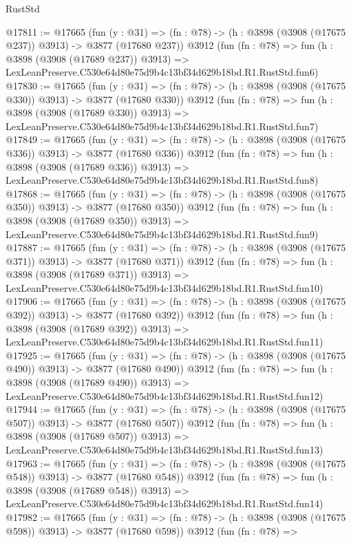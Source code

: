 \begin{lexlean}{RustStd}
\begin{coremodule}
@17811 := @17665
    (fun (y : @31) => (fn : @78) -> (h : @3898 (@3908 (@17675 @237)) @3913) -> @3877 (@17680 @237))
    @3912
    (fun (fn : @78) =>
    fun (h : @3898 (@3908 (@17689 @237)) @3913) =>
    LexLeanPreserve.C530e64d80e75d9b4c13bf34d629b18bd.R1.RustStd.fun6)
@17830 := @17665
    (fun (y : @31) => (fn : @78) -> (h : @3898 (@3908 (@17675 @330)) @3913) -> @3877 (@17680 @330))
    @3912
    (fun (fn : @78) =>
    fun (h : @3898 (@3908 (@17689 @330)) @3913) =>
    LexLeanPreserve.C530e64d80e75d9b4c13bf34d629b18bd.R1.RustStd.fun7)
@17849 := @17665
    (fun (y : @31) => (fn : @78) -> (h : @3898 (@3908 (@17675 @336)) @3913) -> @3877 (@17680 @336))
    @3912
    (fun (fn : @78) =>
    fun (h : @3898 (@3908 (@17689 @336)) @3913) =>
    LexLeanPreserve.C530e64d80e75d9b4c13bf34d629b18bd.R1.RustStd.fun8)
@17868 := @17665
    (fun (y : @31) => (fn : @78) -> (h : @3898 (@3908 (@17675 @350)) @3913) -> @3877 (@17680 @350))
    @3912
    (fun (fn : @78) =>
    fun (h : @3898 (@3908 (@17689 @350)) @3913) =>
    LexLeanPreserve.C530e64d80e75d9b4c13bf34d629b18bd.R1.RustStd.fun9)
@17887 := @17665
    (fun (y : @31) => (fn : @78) -> (h : @3898 (@3908 (@17675 @371)) @3913) -> @3877 (@17680 @371))
    @3912
    (fun (fn : @78) =>
    fun (h : @3898 (@3908 (@17689 @371)) @3913) =>
    LexLeanPreserve.C530e64d80e75d9b4c13bf34d629b18bd.R1.RustStd.fun10)
@17906 := @17665
    (fun (y : @31) => (fn : @78) -> (h : @3898 (@3908 (@17675 @392)) @3913) -> @3877 (@17680 @392))
    @3912
    (fun (fn : @78) =>
    fun (h : @3898 (@3908 (@17689 @392)) @3913) =>
    LexLeanPreserve.C530e64d80e75d9b4c13bf34d629b18bd.R1.RustStd.fun11)
@17925 := @17665
    (fun (y : @31) => (fn : @78) -> (h : @3898 (@3908 (@17675 @490)) @3913) -> @3877 (@17680 @490))
    @3912
    (fun (fn : @78) =>
    fun (h : @3898 (@3908 (@17689 @490)) @3913) =>
    LexLeanPreserve.C530e64d80e75d9b4c13bf34d629b18bd.R1.RustStd.fun12)
@17944 := @17665
    (fun (y : @31) => (fn : @78) -> (h : @3898 (@3908 (@17675 @507)) @3913) -> @3877 (@17680 @507))
    @3912
    (fun (fn : @78) =>
    fun (h : @3898 (@3908 (@17689 @507)) @3913) =>
    LexLeanPreserve.C530e64d80e75d9b4c13bf34d629b18bd.R1.RustStd.fun13)
@17963 := @17665
    (fun (y : @31) => (fn : @78) -> (h : @3898 (@3908 (@17675 @548)) @3913) -> @3877 (@17680 @548))
    @3912
    (fun (fn : @78) =>
    fun (h : @3898 (@3908 (@17689 @548)) @3913) =>
    LexLeanPreserve.C530e64d80e75d9b4c13bf34d629b18bd.R1.RustStd.fun14)
@17982 := @17665
    (fun (y : @31) => (fn : @78) -> (h : @3898 (@3908 (@17675 @598)) @3913) -> @3877 (@17680 @598))
    @3912
    (fun (fn : @78) =>

\end{coremodule}
\end{lexlean}
